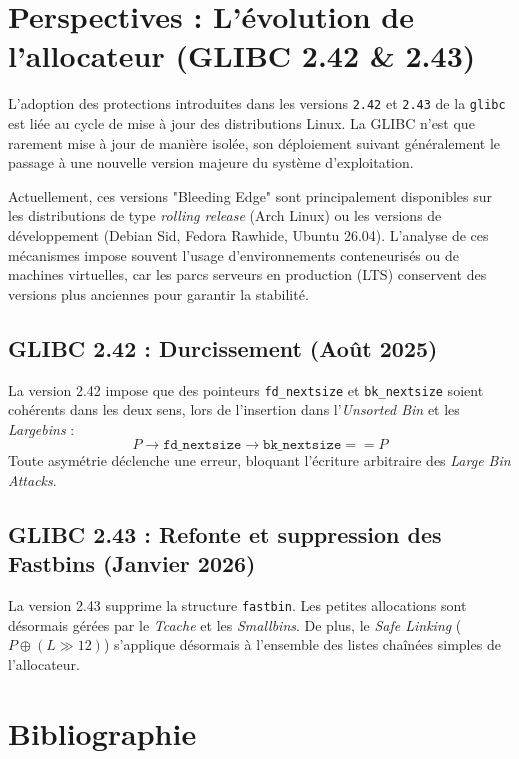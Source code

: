 \section{Perspectives : L'évolution de l'allocateur (GLIBC 2.42 \& 2.43)}
L'adoption des protections introduites dans les versions \texttt{2.42} et \texttt{2.43} de la \texttt{glibc} est liée au cycle de mise à jour des distributions Linux. La GLIBC n'est que rarement mise à jour de manière isolée, son déploiement suivant généralement le passage à une nouvelle version majeure du système d'exploitation.

Actuellement, ces versions "Bleeding Edge" sont principalement disponibles sur les distributions de type \textit{rolling release} (Arch Linux) ou les versions de développement (Debian Sid, Fedora Rawhide, Ubuntu 26.04). L'analyse de ces mécanismes impose souvent l'usage d'environnements conteneurisés ou de machines virtuelles, car les parcs serveurs en production (LTS) conservent des versions plus anciennes pour garantir la stabilité.
\subsection*{GLIBC 2.42 : Durcissement (Août 2025)}
La version 2.42 impose que des pointeurs \texttt{fd\_nextsize} et \texttt{bk\_nextsize} soient cohérents dans les deux sens, lors de l'insertion dans l'\textit{Unsorted Bin} et les \textit{Largebins} :
\[ P\rightarrow\texttt{fd\_nextsize}\rightarrow\texttt{bk\_nextsize} == P \]
Toute asymétrie déclenche une erreur, bloquant l'écriture arbitraire des \textit{Large Bin Attacks}.

\subsection*{GLIBC 2.43 : Refonte et suppression des Fastbins (Janvier 2026)}
La version 2.43 supprime la structure \texttt{fastbin}. Les petites allocations sont désormais gérées par le \textit{Tcache} et les \textit{Smallbins}. De plus, le \textit{Safe Linking} ($P \oplus (L \gg 12)$) s'applique désormais à l'ensemble des listes chaînées simples de l'allocateur.

\section{Bibliographie}

\nocite{*}

  {\list
     {}
     {\setlength{\leftmargin}{\bibhang}%
      \setlength{\itemindent}{-\leftmargin}%
      \setlength{\itemsep}{\bibitemsep}%
      \setlength{\parsep}{\bibparsep}}}
  {\endlist}
  {\item}

\printbibliography[keyword=video, heading=subbibliography, title={Vidéos}]
\printbibliography[keyword=git, heading=subbibliography, title={Dépôts Git / Ressources techniques}]
\printbibliography[keyword=web, heading=subbibliography, title={Sites Web / Articles en ligne}]
\printbibliography[keyword=thesis, heading=subbibliography, title={Mémoires universitaires}]
